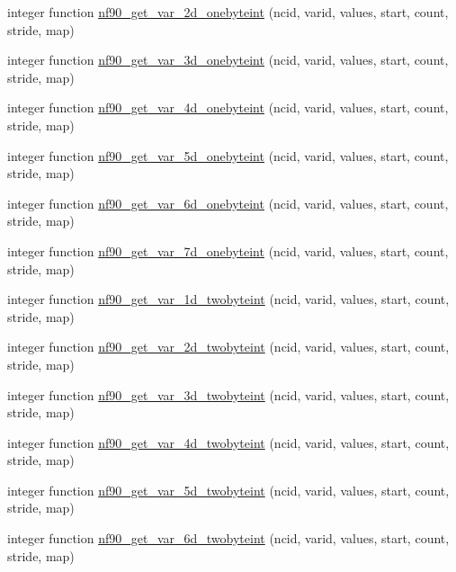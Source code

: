\begin{DoxyCompactItemize}
\item 
integer function \hyperlink{netcdf__expanded_8f90_a7dfc2a9b614f061eafd625723027102c}{nf90\+\_\+get\+\_\+var\+\_\+2d\+\_\+onebyteint} (ncid, varid, values, start, count, stride, map)
\item 
integer function \hyperlink{netcdf__expanded_8f90_a3962ec1603eb3ebfd137988399204dc2}{nf90\+\_\+get\+\_\+var\+\_\+3d\+\_\+onebyteint} (ncid, varid, values, start, count, stride, map)
\item 
integer function \hyperlink{netcdf__expanded_8f90_aebd72fab68982abf0a39c99fd706ddc9}{nf90\+\_\+get\+\_\+var\+\_\+4d\+\_\+onebyteint} (ncid, varid, values, start, count, stride, map)
\item 
integer function \hyperlink{netcdf__expanded_8f90_a762baa41523cbb59f966d15826c09825}{nf90\+\_\+get\+\_\+var\+\_\+5d\+\_\+onebyteint} (ncid, varid, values, start, count, stride, map)
\item 
integer function \hyperlink{netcdf__expanded_8f90_a6fc87306b85b0d055780a2595c65f60d}{nf90\+\_\+get\+\_\+var\+\_\+6d\+\_\+onebyteint} (ncid, varid, values, start, count, stride, map)
\item 
integer function \hyperlink{netcdf__expanded_8f90_a7c46f83cf6857fc4db050cd9e89bd7f8}{nf90\+\_\+get\+\_\+var\+\_\+7d\+\_\+onebyteint} (ncid, varid, values, start, count, stride, map)
\item 
integer function \hyperlink{netcdf__expanded_8f90_a986294ec0a7f1fcececbd52818b518b6}{nf90\+\_\+get\+\_\+var\+\_\+1d\+\_\+twobyteint} (ncid, varid, values, start, count, stride, map)
\item 
integer function \hyperlink{netcdf__expanded_8f90_a942406e8427bff806d085216ef816794}{nf90\+\_\+get\+\_\+var\+\_\+2d\+\_\+twobyteint} (ncid, varid, values, start, count, stride, map)
\item 
integer function \hyperlink{netcdf__expanded_8f90_aa8ce10a7f7f453d5e93ed43afed77d01}{nf90\+\_\+get\+\_\+var\+\_\+3d\+\_\+twobyteint} (ncid, varid, values, start, count, stride, map)
\item 
integer function \hyperlink{netcdf__expanded_8f90_a1cc5680edcbb68a5e70212e488b9cb31}{nf90\+\_\+get\+\_\+var\+\_\+4d\+\_\+twobyteint} (ncid, varid, values, start, count, stride, map)
\item 
integer function \hyperlink{netcdf__expanded_8f90_a5c91959cc4284de5268ad7ddd7b14d01}{nf90\+\_\+get\+\_\+var\+\_\+5d\+\_\+twobyteint} (ncid, varid, values, start, count, stride, map)
\item 
integer function \hyperlink{netcdf__expanded_8f90_a6552783ff6a4fce87261f6af7ed89e72}{nf90\+\_\+get\+\_\+var\+\_\+6d\+\_\+twobyteint} (ncid, varid, values, start, count, stride, map)

\end{DoxyCompactItemize}
